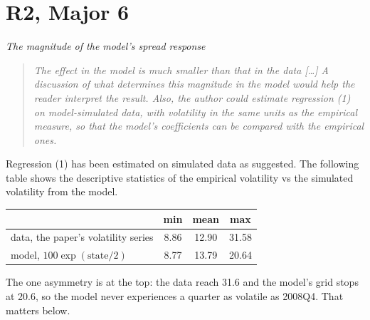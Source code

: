 
\section{R2, Major 6}
{\itshape The magnitude of the model's spread response}

\begin{quote}\itshape
The effect in the model is much smaller than that in the data [\ldots] A
discussion of what determines this magnitude in the model would help the reader
interpret the result. Also, the author could estimate regression (1) on
model-simulated data, with volatility in the same units as the empirical
measure, so that the model's coefficients can be compared with the empirical
ones.
\end{quote}

Regression (1) has been estimated on simulated data as suggested. The following
table shows the descriptive statistics of the empirical volatility vs the
simulated volatility from the model.

\begin{table}[h]
\centering\footnotesize
\begin{tabular}{lccc}
\toprule
 & min & mean & max \\
\midrule
data, the paper's volatility series & 8.86 & 12.90 & 31.58 \\
model, $100\exp(\text{state}/2)$    & 8.77 & 13.79 & 20.64 \\
\bottomrule
\end{tabular}
\end{table}

The one asymmetry is at the top: the data reach 31.6 and the model's grid stops
at 20.6, so the model never experiences a quarter as volatile as 2008Q4. That
matters below.

